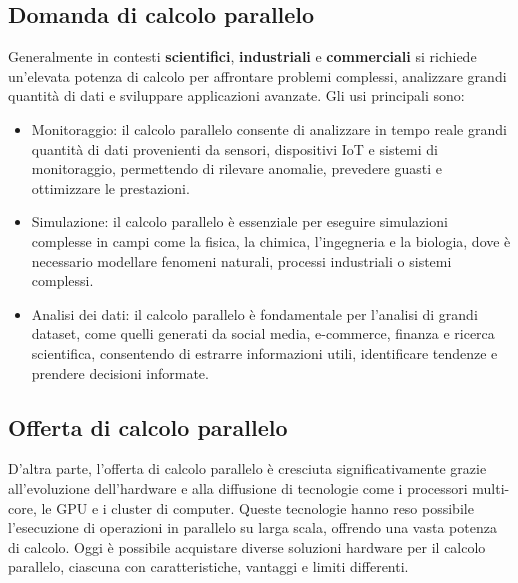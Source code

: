 \subsection{Domanda di calcolo parallelo}
Generalmente in contesti \textbf{scientifici}, \textbf{industriali} e \textbf{commerciali} si richiede un'elevata potenza di calcolo per affrontare problemi complessi, analizzare grandi quantità di dati e sviluppare applicazioni avanzate. Gli usi principali sono:
\begin{itemize}
    \item Monitoraggio: il calcolo parallelo consente di analizzare in tempo reale grandi quantità di dati provenienti da sensori, dispositivi IoT e sistemi di monitoraggio, permettendo di rilevare anomalie, prevedere guasti e ottimizzare le prestazioni.
    \item Simulazione: il calcolo parallelo è essenziale per eseguire simulazioni complesse in campi come la fisica, la chimica, l'ingegneria e la biologia, dove è necessario modellare fenomeni naturali, processi industriali o sistemi complessi.
    \item Analisi dei dati: il calcolo parallelo è fondamentale per l'analisi di grandi dataset, come quelli generati da social media, e-commerce, finanza e ricerca scientifica, consentendo di estrarre informazioni utili, identificare tendenze e prendere decisioni informate.
\end{itemize}

\subsection{Offerta di calcolo parallelo}
D'altra parte, l'offerta di calcolo parallelo è cresciuta significativamente grazie all'evoluzione dell'hardware e alla diffusione di tecnologie come i processori multi-core, le GPU e i cluster di computer. Queste tecnologie hanno reso possibile l'esecuzione di operazioni in parallelo su larga scala, offrendo una vasta potenza di calcolo. Oggi è possibile acquistare diverse soluzioni hardware per il calcolo parallelo, ciascuna con caratteristiche, vantaggi e limiti differenti.


